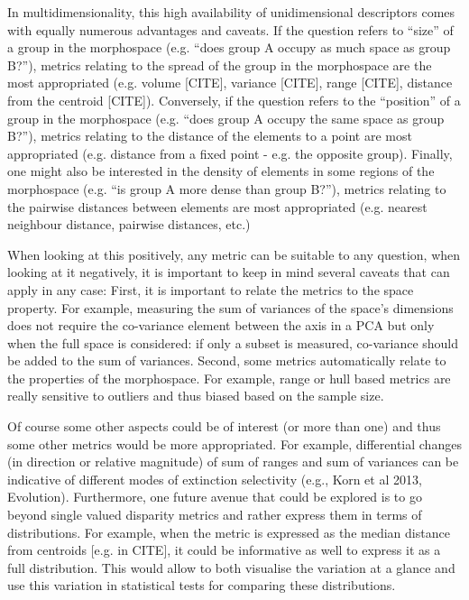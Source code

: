 \documentclass[12pt,letterpaper]{article}
\begin{document}
In multidimensionality, this high availability of unidimensional descriptors comes with equally numerous advantages and caveats.
If the question refers to ``size'' of a group in the morphospace (e.g. ``does group A occupy as much space as group B?''), metrics relating to the spread of the group in the morphospace are the most appropriated (e.g. volume [CITE], variance [CITE], range [CITE], distance from the centroid [CITE]).
Conversely, if the question refers to the ``position'' of a group in the morphospace (e.g. ``does group A occupy the same space as group B?''), metrics relating to the distance of the elements to a point are most appropriated (e.g. distance from a fixed point - e.g. the opposite group).
Finally, one might also be interested in the density of elements in some regions of the morphospace (e.g. ``is group A more dense than group B?''), metrics relating to the pairwise distances between elements are most appropriated (e.g. nearest neighbour distance, pairwise distances, etc.)

When looking at this positively, any metric can be suitable to any question, when looking at it negatively, it is important to keep in mind several caveats that can apply in any case:
First, it is important to relate the metrics to the space property.
For example, measuring the sum of variances of the space's dimensions does not require the co-variance element between the axis in a PCA but only when the full space is considered: if only a subset is measured, co-variance should be added to the sum of variances.
Second, some metrics automatically relate to the properties of the morphospace.
For example, range or hull based metrics are really sensitive to outliers and thus biased based on the sample size.

Of course some other aspects could be of interest (or more than one) and thus some other metrics would be more appropriated.
For example, differential changes (in direction or relative magnitude) of sum of ranges and sum of variances can be indicative of different modes of extinction selectivity (e.g., Korn et al 2013, Evolution).
Furthermore, one future avenue that could be explored is to go beyond single valued disparity metrics and rather express them in terms of distributions.
For example, when the metric is expressed as the median distance from centroids [e.g. in CITE], it could be informative as well to express it as a full distribution.
This would allow to both visualise the variation at a glance and use this variation in statistical tests for comparing these distributions.
\end{document}
